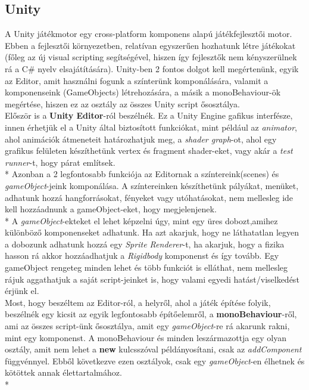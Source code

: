 \subsection{Unity}
A Unity játékmotor egy cross-platform komponens alapú játékfejlesztői motor. Ebben a fejlesztői környezetben, relatívan egyszerűen hozhatunk létre játékokat (főleg az új visual scripting segítségével, hiszen így fejlesztők nem kényszerülnek rá a C\# nyelv elsajátítására). Unity-ben 2 fontos dolgot kell megértenünk, egyik az Editor, amit használni fogunk a színterünk komponálására, valamit a komponenseink (GameObjects) létrehozására, a másik a monoBehaviour-ök megértése, hiszen ez az osztály az összes Unity script ősosztálya.\\
Először is a \textbf{Unity Editor}-ról beszélnék. Ez a Unity Engine gafikus interfésze, innen érhetjük el a Unity által biztosított funkciókat, mint például az \textit{animator}, ahol animációk átmeneteit határozhatjuk meg, a \textit{shader graph}-ot, ahol egy grafikus felületen készíthetünk vertex és fragment shader-eket, vagy akár a \textit{test runner}-t, hogy párat említsek.\\*
Azonban a 2 legfontosabb funkciója az Editornak a színtereink(scenes) és \textit{gameObject}-jeink komponálása. A színtereinken készíthetünk pályákat, menüket, adhatunk hozzá hangforrásokat, fényeket vagy utóhatásokat, nem mellesleg ide kell hozzáadnunk a gameObject-eket, hogy megjelenjenek.\\*
A \textit{gameObject}-ekteket el lehet képzelni úgy, mint egy üres dobozt,amihez különböző komponenseket adhatunk. Ha azt akarjuk, hogy ne láthatatlan legyen a dobozunk adhatunk hozzá egy \textit{Sprite Renderer}-t, ha akarjuk, hogy a fizika hasson rá akkor hozzáadhatjuk a \textit{Rigidbody} komponenst és így tovább. Egy gameObject rengeteg minden lehet és több funkciót is elláthat, nem mellesleg rájuk aggathatjuk a saját script-jeinket is, hogy valami egyedi hatást/viselkedést érjünk el.\\
Most, hogy beszéltem az Editor-ról, a helyről, ahol a játék építése folyik, beszélnék egy kicsit az egyik legfontosabb építőelemről, a \textbf{monoBehaviour}-ről, ami az összes script-ünk ősosztálya, amit egy \textit{gameObject}-re rá akarunk rakni, mint egy komponenst. A monoBehaviour és minden leszármazottja egy olyan osztály, amit nem lehet a \textbf{new} kulcsszóval példányosítani, csak az \textit{addComponent} függvénnyel. Ebből következve ezen osztályok, csak egy \textit{gameObject}-en élhetnek és kötöttek annak élettartalmához.\\*
